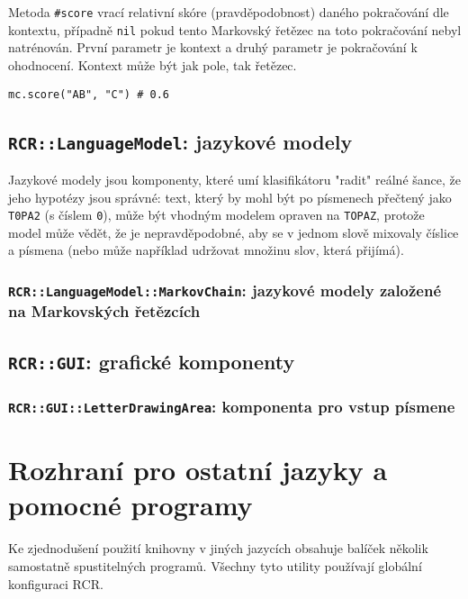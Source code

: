\documentclass[a4paper]{article}
\begin{document}
Metoda \texttt{\#score} vrací relativní skóre (pravděpodobnost) daného
pokračování dle kontextu, případně \texttt{nil} pokud tento Markovský řetězec
na toto pokračování nebyl natrénován. První parametr je kontext a druhý parametr
je pokračování k ohodnocení. Kontext může být jak pole, tak řetězec.
\begin{lstlisting}
mc.score("AB", "C") # 0.6
\end{lstlisting}


\subsection{\texttt{RCR::LanguageModel}: jazykové modely}
Jazykové modely jsou komponenty, které umí klasifikátoru "radit"
reálné šance, že jeho hypotézy jsou správné: text,
který by mohl být po písmenech přečtený jako \texttt{T0PA2} (s číslem
\texttt{0}), může být vhodným modelem opraven na \texttt{TOPAZ}, protože
model může vědět, že je nepravděpodobné, aby se v jednom slově mixovaly
číslice a písmena (nebo může například udržovat množinu slov, která
přijímá).


\subsubsection{\texttt{RCR::LanguageModel::MarkovChain}: jazykové modely
založené na Markovských řetězcích}

\subsection{\texttt{RCR::GUI}: grafické komponenty}
\subsubsection{\texttt{RCR::GUI::LetterDrawingArea}: komponenta pro vstup
písmene}

\section{Rozhraní pro ostatní jazyky a pomocné programy}
Ke zjednodušení použití knihovny v jiných jazycích obsahuje balíček několik
samostatně spustitelných programů. Všechny tyto utility používají globální
konfiguraci RCR.
\end{document}

